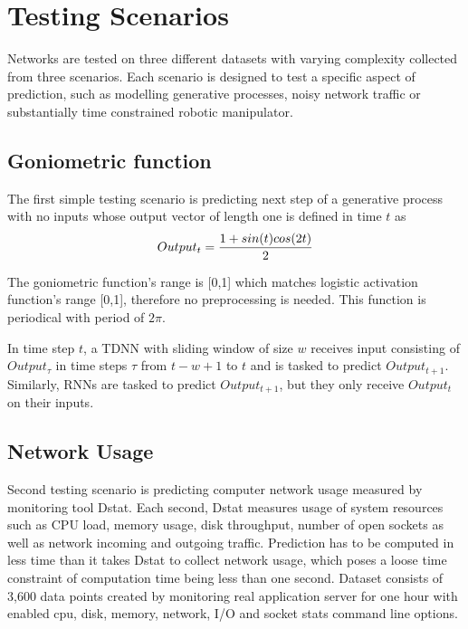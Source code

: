 \documentclass[12pt,oneside]{fithesis2}
\begin{document}
\section{Testing Scenarios}
Networks are tested on three different datasets with varying complexity collected from three scenarios. Each scenario is designed to test a specific aspect of prediction, such as modelling generative processes, noisy network traffic or substantially time constrained robotic manipulator.

\subsection{Goniometric function}
The first simple testing scenario is predicting next step of a generative process with no inputs whose output vector of length one is defined in time $t$ as
$$Output_t ={{1 + sin(t)cos(2t)} \over 2}$$


The goniometric function's range is [0,1] which matches logistic activation function's range [0,1], therefore no preprocessing is needed. This function is periodical with period of $2\pi$. \par
In time step $t$, a TDNN with sliding window of size $w$ receives input consisting of $Output_{\tau}$ in time steps $\tau$ from $t-w+1$ to $t$ and is tasked to predict $Output_{t+1}$. Similarly, RNNs are tasked to predict $Output_{t+1}$, but they only receive $Output_t$ on their inputs.

\subsection{Network Usage}
Second testing scenario is predicting computer network usage measured by monitoring tool Dstat. Each second, Dstat measures usage of system resources such as CPU load, memory usage, disk throughput, number of open sockets as well as network incoming and outgoing traffic. Prediction has to be computed in less time than it takes Dstat to collect network usage, which poses a loose time constraint of computation time being less than one second. Dataset consists of 3,600 data points created by monitoring real application server for one hour with enabled cpu, disk, memory, network, I/O and socket stats command line options. \par
\end{document}

